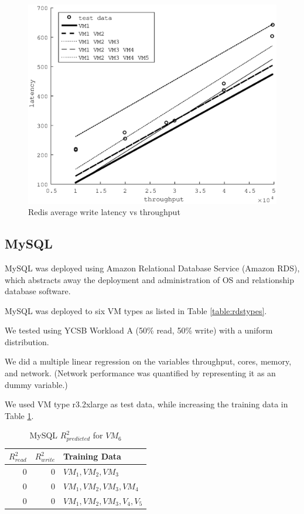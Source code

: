 \documentclass{acm_proc_article-sp}
\begin{document}
\begin{figure}
\centering
\includegraphics[scale = 0.5]{redis_write_plot.eps}
\caption{Redis average write latency vs throughput}
\label{figure:rediswrite}
\end{figure}

\subsection{MySQL}

MySQL was deployed using Amazon Relational Database Service (Amazon RDS), which abstracts away the deployment and administration of OS and relationship database software.

MySQL was deployed to six VM types as listed in Table \ref{table:rdstypes}.

We tested using YCSB Workload A (50\% read, 50\% write) with a uniform distribution.

We did a multiple linear regression on the variables throughput, cores, memory, and network.  (Network performance was quantified by representing it as an dummy variable.)

We used VM type r3.2xlarge as test data, while increasing the training data in Table \ref{table:mysql}.

\begin{table}
\centering
\caption{MySQL $R_{predicted}^2$ for $VM_6$}
\begin{tabular}{|r|r|l|} \hline
$R_{read}^2$&$R_{write}^2$&Training Data\\ \hline
0 & 0& $VM_1,VM_2,VM_3$\\ \hline
0 & 0& $VM_1,VM_2,VM_3,VM_4$\\ \hline
0 & 0& $VM_1,VM_2,VM_3,V_4,V_5$\\ \hline
\hline\end{tabular}
\label{table:mysql}
\end{table}
\end{document}
